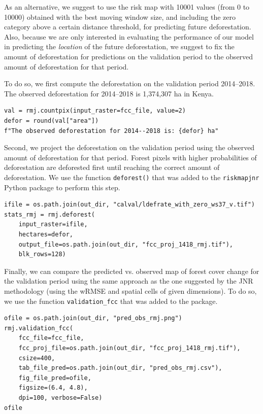 \documentclass[paper=a4, 12pt, DIV=12]{scrartcl}
\begin{document}
As an alternative, we suggest to use the risk map with 10001 values (from 0 to 10000) obtained with the best moving window size, and including the zero category above a certain distance threshold, for predicting future deforestation. Also, because we are only interested in evaluating the performance of our model in predicting the \emph{location} of the future deforestation, we suggest to fix the amount of deforestation for predictions on the validation period to the observed amount of deforestation for that period.

To do so, we first compute the deforestation on the validation period 2014--2018. The observed deforestation for 2014--2018 is 1,374,307 ha in Kenya.

\begin{verbatim}
val = rmj.countpix(input_raster=fcc_file, value=2)
defor = round(val["area"])
f"The observed deforestation for 2014--2018 is: {defor} ha"
\end{verbatim}

Second, we project the deforestation on the validation period using the observed amount of deforestation for that period. Forest pixels with higher probabilities of deforestation are deforested first until reaching the correct amount of deforestation. We use the function \texttt{deforest()} that was added to the \texttt{riskmapjnr} Python package to perform this step.

\begin{verbatim}
ifile = os.path.join(out_dir, "calval/ldefrate_with_zero_ws37_v.tif")
stats_rmj = rmj.deforest(
    input_raster=ifile,
    hectares=defor,
    output_file=os.path.join(out_dir, "fcc_proj_1418_rmj.tif"),
    blk_rows=128)
\end{verbatim}

Finally, we can compare the predicted vs. observed map of forest cover change for the validation period using the same approach as the one suggested by the JNR methodology (using the wRMSE and spatial cells of given dimensions). To do so, we use the function \texttt{validation\_fcc} that was added to the package.

\begin{verbatim}
ofile = os.path.join(out_dir, "pred_obs_rmj.png")
rmj.validation_fcc(
    fcc_file=fcc_file,
    fcc_proj_file=os.path.join(out_dir, "fcc_proj_1418_rmj.tif"),
    csize=400,
    tab_file_pred=os.path.join(out_dir, "pred_obs_rmj.csv"),
    fig_file_pred=ofile,
    figsize=(6.4, 4.8),
    dpi=100, verbose=False)
ofile
\end{verbatim}
\end{document}
